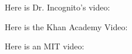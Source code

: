 \documentclass[handout]{ximera}
\begin{document}
Here is Dr. Incognito's video:
\begin{expandable}
\begin{center}
\end{center}
\end{expandable}

Here is the Khan Academy Video:
\begin{expandable}
\begin{center}
\end{center}
\end{expandable}

Here is an MIT video:
\begin{expandable}
\begin{center}
\end{center}
\end{expandable}
\end{document}
